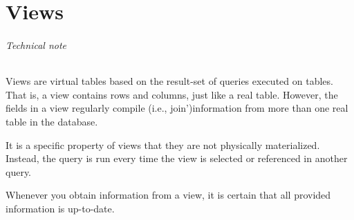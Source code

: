 \chapter{Views}\label{chap_views}

\subparagraph{Technical note}
Views are virtual tables based on the result-set of queries executed on tables.
That is, a view contains rows and columns, just like a real table. 
However, the fields in a view regularly compile (i.e., join')information from more than one real table in the database.

It is a specific property of views that they are not physically materialized. Instead, the query is run every time the view is selected or referenced in another query.

Whenever you obtain information from a view, it is certain that all provided information is up-to-date.

